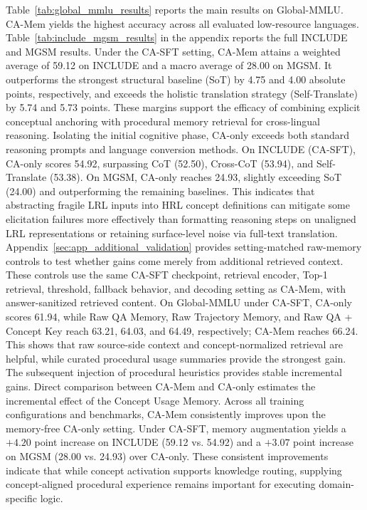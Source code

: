 \documentclass[11pt]{article}
\begin{document}
Table~\ref{tab:global_mmlu_results} reports the main results on Global-MMLU.
CA-Mem yields the highest accuracy across all evaluated low-resource languages.
Table~\ref{tab:include_mgsm_results} in the appendix reports the full INCLUDE and MGSM results. Under the CA-SFT setting, CA-Mem attains a weighted average of 59.12 on INCLUDE and a macro average of 28.00 on MGSM.
It outperforms the strongest structural baseline (SoT) by 4.75 and 4.00 absolute points, respectively, and exceeds the holistic translation strategy (Self-Translate) by 5.74 and 5.73 points.
These margins support the efficacy of combining explicit conceptual anchoring with procedural memory retrieval for cross-lingual reasoning.
Isolating the initial cognitive phase, CA-only exceeds both standard reasoning prompts and language conversion methods.
On INCLUDE (CA-SFT), CA-only scores 54.92, surpassing CoT (52.50), Cross-CoT (53.94), and Self-Translate (53.38).
On MGSM, CA-only reaches 24.93, slightly exceeding SoT (24.00) and outperforming the remaining baselines.
This indicates that abstracting fragile LRL inputs into HRL concept definitions can mitigate some elicitation failures more effectively than formatting reasoning steps on unaligned LRL representations or retaining surface-level noise via full-text translation.
Appendix~\ref{sec:app_additional_validation} provides setting-matched raw-memory controls to test whether gains come merely from additional retrieved context.
These controls use the same CA-SFT checkpoint, retrieval encoder, Top-1 retrieval, threshold, fallback behavior, and decoding setting as CA-Mem, with answer-sanitized retrieved content.
On Global-MMLU under CA-SFT, CA-only scores 61.94, while Raw QA Memory, Raw Trajectory Memory, and Raw QA + Concept Key reach 63.21, 64.03, and 64.49, respectively; CA-Mem reaches 66.24.
This shows that raw source-side context and concept-normalized retrieval are helpful, while curated procedural usage summaries provide the strongest gain.
The subsequent injection of procedural heuristics provides stable incremental gains. Direct comparison between CA-Mem and CA-only estimates the incremental effect of the Concept Usage Memory.
Across all training configurations and benchmarks, CA-Mem consistently improves upon the memory-free CA-only setting.
Under CA-SFT, memory augmentation yields a $+4.20$ point increase on INCLUDE (59.12 vs. 54.92) and a $+3.07$ point increase on MGSM (28.00 vs. 24.93) over CA-only.
These consistent improvements indicate that while concept activation supports knowledge routing, supplying concept-aligned procedural experience remains important for executing domain-specific logic.
\end{document}

